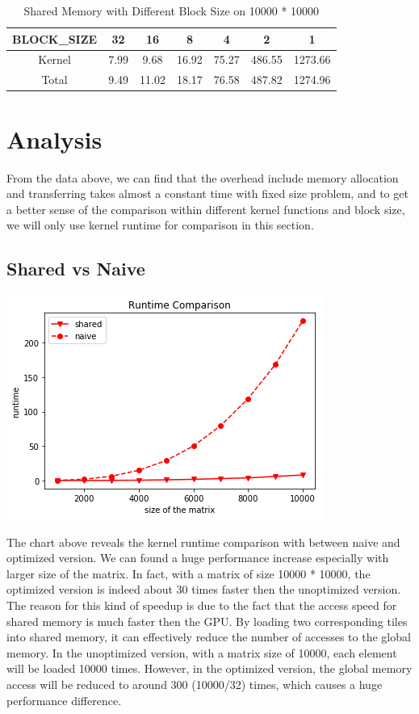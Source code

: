 \documentclass{cs4444}
\begin{document}
\begin{table}[ht]
\caption {Shared Memory with Different Block Size on 10000 * 10000}
\centering
\begin{tabular}{c| c c c c c c}
\hline\hline
BLOCK\_SIZE & 32 & 16 & 8 & 4 & 2 & 1 \\
\hline
Kernel & 7.99 & 9.68 & 16.92 & 75.27 & 486.55 & 1273.66 \\
Total & 9.49 & 11.02 & 18.17 & 76.58 & 487.82 & 1274.96\\
\end{tabular}
\centering
\end{table}

\begin{center}
\end{center}

\section{Analysis}
From the data above, we can find that the overhead include memory allocation and transferring takes almost a constant time with fixed size problem, and to get a better sense of the comparison within different kernel functions and block size, we will only use kernel runtime for comparison in this section.
\subsection{Shared vs Naive}
\begin{center}
\includegraphics{comparison1}	
\end{center}
The chart above reveals the kernel runtime comparison with between naive and optimized version. We can found a huge performance increase especially with larger size of the matrix. In fact, with a matrix of size 10000 * 10000, the optimized version is indeed about 30 times faster then the unoptimized version. The reason for this kind of speedup is due to the fact that the access speed for shared memory is much faster then the GPU. By loading two corresponding tiles into shared memory, it can effectively reduce the number of accesses to the global memory. In the unoptimized version, with a matrix size of 10000, each element will be loaded 10000 times. However, in the optimized version, the global memory access will be reduced to around 300 (10000/32) times, which causes a huge performance difference.
\end{document}
